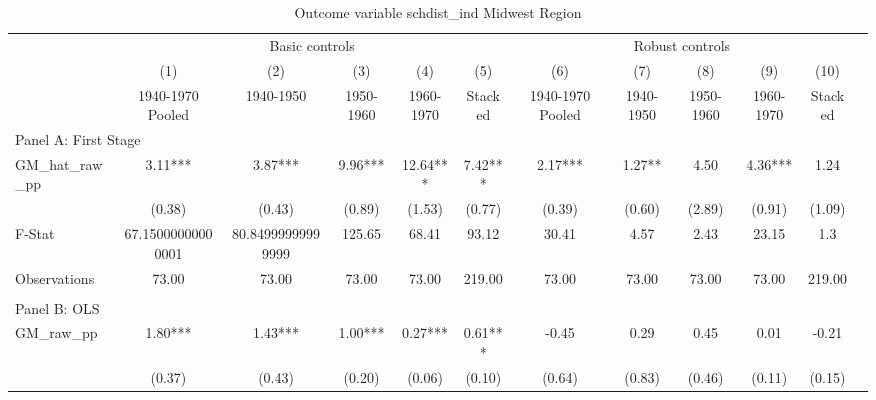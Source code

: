  \begin{table}[htbp]\centering {} \begin{threeparttable} \caption{Outcome variable schdist\_ind Midwest Region} \begin{tabular}{l*{11}{c}} \toprule
          &\multicolumn{5}{c}{Basic controls}                                   &\multicolumn{5}{c}{Robust controls}                                  \\\cmidrule(lr){2-6}\cmidrule(lr){7-11}
          &\multicolumn{1}{c}{(1)}&\multicolumn{1}{c}{(2)}&\multicolumn{1}{c}{(3)}&\multicolumn{1}{c}{(4)}&\multicolumn{1}{c}{(5)}&\multicolumn{1}{c}{(6)}&\multicolumn{1}{c}{(7)}&\multicolumn{1}{c}{(8)}&\multicolumn{1}{c}{(9)}&\multicolumn{1}{c}{(10)}\\
          &\multicolumn{1}{c}{1940-1970 Pooled}&\multicolumn{1}{c}{1940-1950}&\multicolumn{1}{c}{1950-1960}&\multicolumn{1}{c}{1960-1970}&\multicolumn{1}{c}{Stacked}&\multicolumn{1}{c}{1940-1970 Pooled}&\multicolumn{1}{c}{1940-1950}&\multicolumn{1}{c}{1950-1960}&\multicolumn{1}{c}{1960-1970}&\multicolumn{1}{c}{Stacked}\\
\cmidrule(lr){1-11}
\multicolumn{10}{l}{Panel A: First Stage}\\
\cmidrule(lr){1-11}
GM\_hat\_raw\_pp&      3.11***&      3.87***&      9.96***&     12.64***&      7.42***&      2.17***&      1.27** &      4.50   &      4.36***&      1.24   \\
          &    (0.38)   &    (0.43)   &    (0.89)   &    (1.53)   &    (0.77)   &    (0.39)   &    (0.60)   &    (2.89)   &    (0.91)   &    (1.09)   \\
\midrule
F-Stat    &67.15000000000001   &80.84999999999999   &    125.65   &     68.41   &     93.12   &     30.41   &      4.57   &      2.43   &     23.15   &       1.3   \\
Observations&     73.00   &     73.00   &     73.00   &     73.00   &    219.00   &     73.00   &     73.00   &     73.00   &     73.00   &    219.00   \\
\cmidrule[\heavyrulewidth](lr){1-11} \\ \cmidrule[\heavyrulewidth](lr){1-11}
\multicolumn{10}{l}{Panel B: OLS}\\
\cmidrule(lr){1-11}
GM\_raw\_pp &      1.80***&      1.43***&      1.00***&      0.27***&      0.61***&     -0.45   &      0.29   &      0.45   &      0.01   &     -0.21   \\
          &    (0.37)   &    (0.43)   &    (0.20)   &    (0.06)   &    (0.10)   &    (0.64)   &    (0.83)   &    (0.46)   &    (0.11)   &    (0.15)   \\

\end{tabular}
\end{threeparttable}
\end{table}
